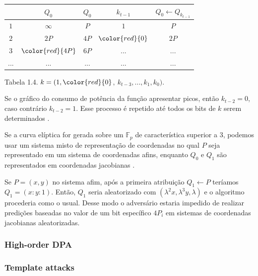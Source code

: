\begin{center}
    \begin{tabular}{|c|c|c|c|c|}
	    \hline
		    \   & $Q_{0}$  & $Q_{0}$ & $k_{t-1}$ & $Q_{0} \leftarrow Q_{k_{t-1}}$\\
	    \hline
	        $1$ & $\infty$ &     $P$ &       $1$ & $P$\\
	    \hline
		    $2$ & $2P$ & $4P$ & $\color{red}{0}$ & $2P$ \\
	    \hline
		    $3$ & $\color{red}{4P}$ & $6P$ & ...& ... \\
	    \hline
		    ... & ... & ... & ...& ... \\
	    \hline
    \end{tabular}

    Tabela 1.4. $k = (1, \color{red}{0}$$,\ $$k_{t-3}, ..., k_{1}, k_{0})$.
\end{center}

Se o gr\'{a}fico do consumo de pot\^{e}ncia da fun\c{c}\~{a}o apresentar picos, ent\~{a}o $k_{t-2} = 0$, caso contr\'{a}rio $k_{t-2} = 1$.
Esse processo \'{e} repetido at\'{e} todos os bits de $k$ serem determinados \cite{ECCBook_HankersonVanstone2004}.

Se a curva el\'{i}ptica for gerada sobre um $\mathbb{F}_{p}$ de caracter\'{i}stica superior a 3, podemos usar um sistema misto de representa\c{c}\~{a}o de coordenadas no qual $P$ seja representado em um sistema de coordenadas afins, enquanto $Q_{0}$ e $Q_{1}$ s\~{a}o representados em coordenadas jacobianas \cite{ECCBook_HankersonVanstone2004}.

Se $P = (x,y)$ no sistema afim, ap\'{o}s a primeira atribui\c{c}\~{a}o $Q_{1} \leftarrow P$ ter\'{i}amos $ Q_{1} = (x : y : 1)$. Ent\~{a}o, $Q_{1}$ seria aleatorizado com $(\lambda^{2}x, \lambda^{3}y, \lambda)$ e o algoritmo procederia como o usual. Desse modo o advers\'{a}rio estaria impedido de realizar predi\c{c}\~{o}es baseadas no valor de um bit espec\'{i}fico $4P_{i}$ em sistemas de coordenadas jacobianas aleatorizadas.

\subsubsection{High-order DPA}

\subsubsection{Template attacks}
